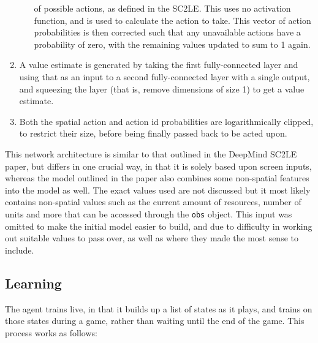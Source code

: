 \begin{enumerate}
\begin{enumerate}
            of possible actions, as defined in the SC2LE\@. This uses no
            activation function, and is used to calculate the action to take.
            This vector of action probabilities is then corrected such that any
            unavailable actions have a probability of zero, with the remaining
            values updated to sum to 1 again.
    \end{enumerate}
    \item A value estimate is generated by taking the first fully-connected
        layer and using that as an input to a second fully-connected layer with
        a single output, and squeezing the layer (that is, remove dimensions of
        size 1) to get a value estimate.
    \item Both the spatial action and action id probabilities are
        logarithmically clipped, to restrict their size, before being finally
        passed back to be acted upon.
\end{enumerate}

This network architecture is similar to that outlined in the DeepMind SC2LE
paper, but differs in one crucial way, in that it is solely based upon screen
inputs, whereas the model outlined in the paper also combines some non-spatial
features into the model as well. The exact values used are not discussed but it
most likely contains non-spatial values such as the current amount of resources,
number of units and more that can be accessed through the \texttt{obs} object.
This input was omitted to make the initial model easier to build, and due to
difficulty in working out suitable values to pass over, as well as where they
made the most sense to include.

\subsection{Learning}

The agent trains live, in that it builds up a list of states as it plays, and
trains on those states during a game, rather than waiting until the end of the
game. This process works as follows:

